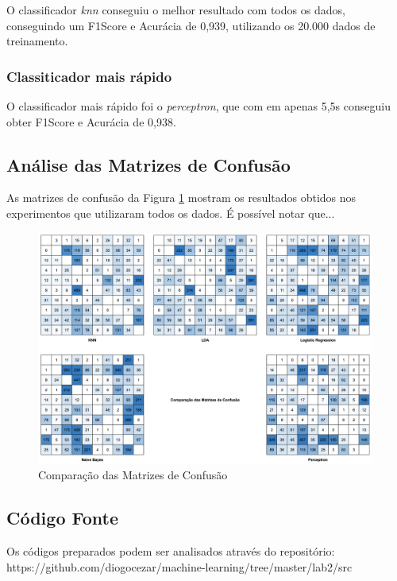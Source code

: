\documentclass[12pt]{article}
\begin{document}
O classificador \textit{knn} conseguiu o melhor resultado com todos os dados, conseguindo um F1Score e Acurácia de 0,939, utilizando os 20.000 dados de treinamento.

\subsubsection{Classiticador mais rápido}

O classificador mais rápido foi o \textit{perceptron}, que com em apenas 5,5s conseguiu obter F1Score e Acurácia de 0,938.

\subsection{Análise das Matrizes de Confusão}

As matrizes de confusão da Figura \ref{fig:comparacao_conf_mat} mostram os resultados obtidos nos experimentos que utilizaram todos os dados. É possível notar que...

\begin{figure}[!htb]
  \centering
  \includegraphics[width=30em]{images/image_comparacao_conf_mat.png}
  \caption{Comparação das Matrizes de Confusão}
  \label{fig:comparacao_conf_mat}
\end{figure}

\subsection{Código Fonte}

Os códigos preparados podem ser analisados através do repositório: https://github.com/diogocezar/machine-learning/tree/master/lab2/src
\end{document}
